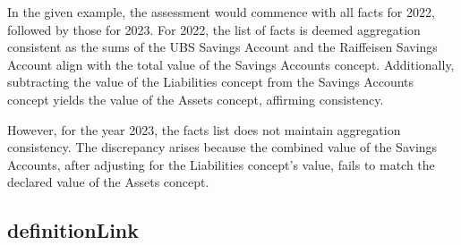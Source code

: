 In the given example, the assessment would commence with all facts for 2022, followed by those for 2023.  
For 2022, the list of facts is deemed aggregation consistent as the sums of the UBS Savings Account and the Raiffeisen Savings Account align with the total value of the Savings Accounts concept.  
Additionally, subtracting the value of the Liabilities concept from the Savings Accounts concept yields the value of the Assets concept, affirming consistency.

However, for the year 2023, the facts list does not maintain aggregation consistency.  
The discrepancy arises because the combined value of the Savings Accounts, after adjusting for the Liabilities concept's value, fails to match the declared value of the Assets concept.

\subsection{definitionLink}
\label{sec:definitionLink}






